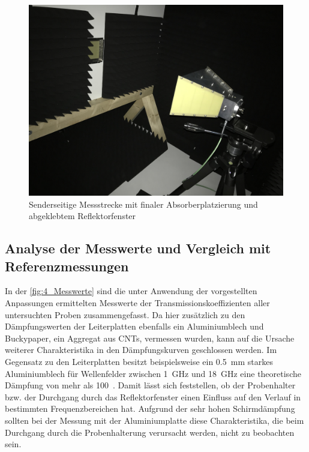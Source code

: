 \begin{figure}[H]
    \centering
    \includegraphics[height=.25\textheight, draft = false]{Abbildungen/Kapitel4/IMG_5719.jpg}
    \caption{Senderseitige Messstrecke mit finaler Absorberplatzierung und abgeklebtem Reflektorfenster}
    \label{fig:4_finaler_Aufbau}
\end{figure}


\subsection{Analyse der Messwerte und Vergleich mit Referenzmessungen}\label{cha:4_sub_Analyse_und_Vergleich}

In der \Abb\ref{fig:4_Messwerte} sind die unter Anwendung der vorgestellten Anpassungen ermittelten Messwerte der Transmissionskoeffizienten aller untersuchten Proben zusammengefasst. Da hier zusätzlich zu den Dämpfungswerten der Leiterplatten ebenfalls ein Aluminiumblech und Buckypaper, ein Aggregat aus \acp{CNT}, vermessen wurden, kann auf die Ursache weiterer Charakteristika in den Dämpfungskurven geschlossen werden. Im Gegensatz zu den Leiterplatten besitzt beispielsweise ein \SI{0,5}{\milli\meter} starkes Aluminiumblech für Wellenfelder zwischen \SI{1}{\giga\hertz} und \SI{18}{\giga\hertz} eine theoretische Dämpfung von mehr als \SI{100}{\Dezibel}~\cite{EM_Schirmung}. Damit lässt sich feststellen, ob der Probenhalter bzw. der Durchgang durch das Reflektorfenster einen Einfluss auf den Verlauf in bestimmten Frequenzbereichen hat. Aufgrund der sehr hohen Schirmdämpfung sollten bei der Messung mit der Aluminiumplatte diese Charakteristika, die beim Durchgang durch die Probenhalterung verursacht werden, nicht zu beobachten sein.
\par
\vspace{\linespace}

